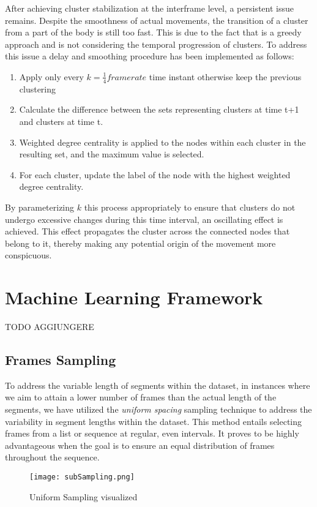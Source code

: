 After achieving cluster stabilization at the interframe level, a persistent issue remains. 
Despite the smoothness of actual movements, the transition of a cluster from a part of the body is still too fast.
This is due to the fact that is a greedy approach and is not considering the temporal progression of clusters.
To address this issue a delay and smoothing procedure has been implemented as follows:
\begin{enumerate}
  \item Apply only every $k = \frac{1}{4}framerate$ time instant otherwise keep the previous clustering
  \item Calculate the difference between the sets representing clusters at time t+1 and clusters at time t.
  \item Weighted degree centrality is applied to the nodes within each cluster in the resulting set, and the maximum value is selected.
  \item For each cluster, update the label of the node with the highest weighted degree centrality.
\end{enumerate}

By parameterizing $k$ this process appropriately to ensure that clusters do not undergo excessive changes during this time interval, an oscillating effect is achieved. 
This effect propagates the cluster across the connected nodes that belong to it, thereby making any potential origin of the movement more conspicuous.

\clearpage
\section{Machine Learning Framework}
\label{sec:ml_method}
TODO AGGIUNGERE

\subsection{Frames Sampling}
To address the variable length of segments within the dataset, in instances where we aim to attain a lower number of frames than the actual length of the segments, 
we have utilized the \textit{uniform spacing} sampling technique to address the variability in segment lengths within the dataset.
This method entails selecting frames from a list or sequence at regular, even intervals. 
It proves to be highly advantageous when the goal is to ensure an equal distribution of frames throughout the sequence.

\begin{figure}[H]
    \centering
    \texttt{[image: subSampling.png]}
    \caption{Uniform Sampling visualized}
    \label{fig:unif_sampling}
\end{figure}

